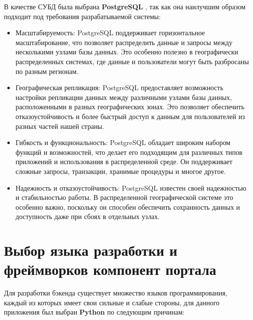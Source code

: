 В качестве СУБД была выбрана \textbf{PostgreSQL} \cite{postgresql}, так как она наилучшим
образом подходит под требования разрабатываемой системы:
\begin{itemize}
	\item Масштабируемость: PostgreSQL поддерживает горизонтальное масштабирование, что позволяет распределить данные и запросы между несколькими узлами базы данных. Это особенно полезно в географически распределенных системах, где данные и пользователи могут быть разбросаны по разным регионам.
	\item Географическая репликация: PostgreSQL предоставляет возможность
настройки репликации данных между различными узлами базы данных, расположенными в разных географических зонах. Это позволяет
обеспечить отказоустойчивость и более быстрый доступ к данным для
пользователей из разных частей нашей страны.
	\item Гибкость и функциональность: PostgreSQL обладает широким набором
функций и возможностей, что делает его подходящим для различных
типов приложений и использования в распределенной среде. Он поддерживает сложные запросы, транзакции, хранимые процедуры и многое
другое.
	\item Надежность и отказоустойчивость: PostgreSQL известен своей надежностью и стабильностью работы. В распределенной географической
системе это особенно важно, поскольку он способен обеспечить сохранность данных и доступность даже при сбоях в отдельных узлах.
\end{itemize}


\section{Выбор языка разработки и фреймворков компонент
портала}

Для разработки бэкенда существует множество языков программирования, каждый из которых имеет свои сильные и слабые стороны, для данного приложения был выбран \textbf{Python} \cite{python} по следующим причинам:

